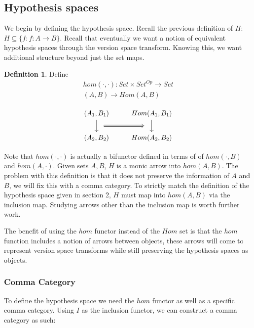 \documentclass{article}
\theoremstyle{definition}
\newtheorem{definition}{Definition}[section]
\begin{document}
\subsection{Hypothesis spaces}
We begin by defining the hypothesis space. Recall the previous definition of $H$: $H\subseteq \{f: f: A \rightarrow B\}$.
Recall that eventually we want a notion of equivalent hypothesis spaces through the version space transform. Knowing this, we want additional structure beyond just the set maps. 

\begin{definition}
Define 
\begin{gather*}
    hom(\cdot,\cdot):Set \times Set^{Op} \rightarrow Set \\
    (A,B) \rightarrow Hom(A,B) \\
\end{gather*}
\[\begin{tikzcd}
	{(A_1, B_1)} & {Hom(A_1, B_1)} \\
	{(A_2,B_2)} & {Hom(A_2,B_2)}
	\arrow[""{name=0, anchor=center, inner sep=0}, from=1-2, to=2-2]
	\arrow[""{name=1, anchor=center, inner sep=0}, from=1-1, to=2-1]
	\arrow[shorten <=10pt, shorten >=10pt, Rightarrow, from=1, to=0]
\end{tikzcd}\]
\end{definition}
Note that $hom(\cdot, \cdot)$ is actually a bifunctor defined in terms of of $hom(\cdot,B)$ and $hom(A,\cdot)$. Given sets $A, B$, $H$ is a monic arrow into $hom(A,B)$. The problem with this definition is that it does not preserve the information of $A$ and $B$, we will fix this with a comma category. To strictly match the definition of the hypothesis space given in section 2, $H$ must map into $hom(A,B)$ via the inclusion map. Studying arrows other than the inclusion map is worth further work. 

The benefit of using the $hom$ functor instead of the $Hom$ set is that the $hom$ function includes a notion of arrows between objects, these arrows will come to represent version space transforms while still preserving the hypothesis spaces as objects. 

\subsubsection{Comma Category}
To define the hypothesis space we need the $hom$ functor as well as a specific comma category. Using $I$ as the inclusion functor, we can construct a comma category as such: 
\end{document}
